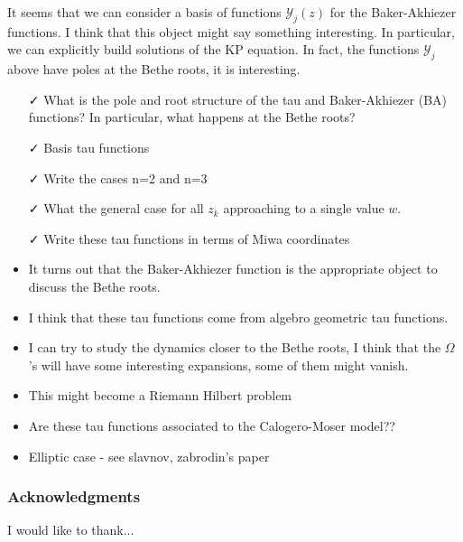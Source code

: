 \documentclass[a4paper,11pt]{amsart}
\begin{document}
It seems that we can consider a basis of functions \(\mathcal{Y}_j(z)\) for the Baker-Akhiezer
functions. I think that this object might say something interesting. In particular, we can
explicitly build solutions of the KP equation. In fact, the functions \(\mathcal{Y}_j\)
above have poles at the Bethe roots, it is interesting. 
\begin{itemize}
\item[\faCheck] What is the pole and root structure of the tau and Baker-Akhiezer (BA) functions?
  In particular, what happens at the Bethe roots?
\item[\faCheck] Basis tau functions
\item[\faCheck] Write the cases n=2 and n=3
\item[\faCheck] What the general case for all \(z_k\) approaching to a single
  value \(w\). 
\item[\faCheck] Write these tau functions in terms of Miwa coordinates
\item It turns out that the Baker-Akhiezer function is the appropriate object to discuss
  the Bethe roots. 
  \item I think that these tau functions come from algebro geometric tau functions. 
  \item I can try to study the dynamics closer to the Bethe roots, I think that the
    \(\Omega\)'s will have some interesting expansions, some of them might vanish. 
  \item This might become a Riemann Hilbert problem
  \item Are these tau functions associated to the Calogero-Moser model??
  \item Elliptic case - see slavnov, zabrodin's paper
\end{itemize}





\subsubsection*{Acknowledgments}
I would like to thank...

\printbibliography
\end{document}
